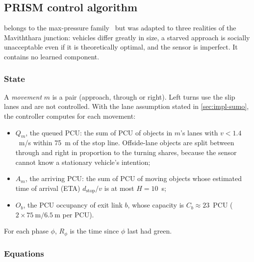 \subsection{PRISM control algorithm}\label{sec:impl-prism}

\prism{} belongs to the max-pressure family~\cite{varaiya2013maxpressure,tassiulas1992} but was adapted
to three realities of the Maviththara junction: vehicles differ greatly in size, a starved approach is
socially unacceptable even if it is theoretically optimal, and the sensor is imperfect.  It contains no learned component.

\subsubsection{State}

A \emph{movement} $m$ is a pair (approach, through or right). Left turns use the slip lanes and are
not controlled. With the lane assumption stated in \cref{sec:impl-sumo}, the controller computes for
each movement:
\begin{itemize}[noitemsep]
  \item $Q_m$, the queued PCU: the sum of PCU of objects in $m$'s lanes with $v < 1.4$~m/s within
        75~m of the stop line. Offside-lane objects are split between through and right in proportion
        to the \dtx{} turning shares, because the sensor cannot know a stationary vehicle's intention;
  \item $A_m$, the arriving PCU: the sum of PCU of moving objects whose estimated time of
        arrival (ETA) $d_{\text{stop}}/v$ is at most $H = 10$~s;
  \item $O_b$, the PCU occupancy of exit link $b$, whose capacity is $C_b \approx 23$~PCU
        ($2 \times 75~\text{m} / 6.5~\text{m}$ per PCU).
\end{itemize}
For each phase $\phi$, $R_\phi$ is the time since $\phi$ last had green.

\subsubsection{Equations}

